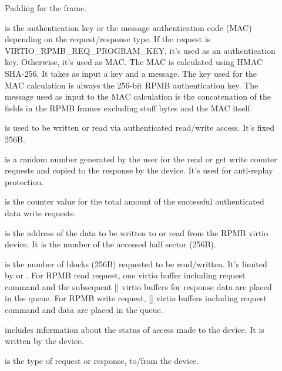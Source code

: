 \begin{description}
\item[] Padding for the frame.

\item[] is the authentication key or the message
   authentication code (MAC) depending on the request/response type.
   If the request is VIRTIO_RPMB_REQ_PROGRAM_KEY, it's used as an
   authentication key. Otherwise, it's used as MAC. The MAC is calculated
   using HMAC SHA-256. It takes as input a key and a message. The key
   used for the MAC calculation is always the 256-bit RPMB authentication
   key. The message used as input to the MAC calculation is the
   concatenation of the fields in the RPMB frames excluding stuff bytes
   and the MAC itself.

\item[] is used to be written or read via authenticated
   read/write access. It's fixed 256B.

\item[] is a random number generated by the user for the read
   or get write counter requests and copied to the response by the device.
   It's used for anti-replay protection.

\item[] is the counter value for the total amount of
   the successful authenticated data write requests.

\item[] is the address of the data to be written to or read
   from the RPMB virtio device. It is the number of the accessed
   half sector (256B).

\item[] is the number of blocks (256B) requested to be
   read/written. It's limited by  or .
   For RPMB read request, one virtio buffer including request command and
   the subsequent [] virtio buffers for response data
   are placed in the queue.
   For RPMB write request, [] virtio buffers including
   request command and data are placed in the queue.

\item[] includes information about the status of access made
   to the device. It is written by the device.

\item[] is the type of request or response, to/from the device.
\end{description}

